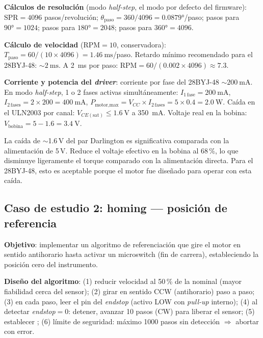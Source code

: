 \documentclass[11pt]{article}
\begin{document}
\textbf{Cálculos de resolución} (modo \emph{half-step}, el modo por defecto del
firmware): $\text{SPR}=4096$ pasos/revolución;
$\theta_\text{paso}=360/4096=0.0879\si{\degree}$/paso; pasos para $90\si{\degree}=1024$;
pasos para $180\si{\degree}=2048$; pasos para $360\si{\degree}=4096$.

\textbf{Cálculo de velocidad} (RPM$=10$, conservadora):
$T_\text{paso}=60/(10\times 4096)=\SI{1.46}{\milli\second}$/paso. Retardo mínimo
recomendado para el 28BYJ-48: $\sim\SI{2}{\milli\second}$. A \SI{2}{\milli\second} por
paso: RPM$=60/(0.002\times 4096)\approx 7.3$.

\textbf{Corriente y potencia del \emph{driver}}: corriente por fase del 28BYJ-48
$\sim\SI{200}{\milli\ampere}$. En modo \emph{half-step}, 1 o 2 fases activas
simultáneamente: $I_{1\,\text{fase}}=\SI{200}{\milli\ampere}$,
$I_{2\,\text{fases}}=2\times 200=\SI{400}{\milli\ampere}$,
$P_\text{motor,max}=V_{CC}\times I_{2\,\text{fases}}=5\times 0.4=\SI{2.0}{\watt}$. Caída
en el ULN2003 por canal: $V_{CE(\text{sat})}\le\SI{1.6}{\volt}$ a \SI{350}{\milli\ampere}.
Voltaje real en la bobina: $V_\text{bobina}=5-1.6=\SI{3.4}{\volt}$.

\begin{nota}
La caída de $\sim$1.6\,V del par Darlington es significativa comparada con la
alimentación de 5\,V. Reduce el voltaje efectivo en la bobina al 68\,\%, lo que
disminuye ligeramente el torque comparado con la alimentación directa. Para el
28BYJ-48, esto es aceptable porque el motor fue diseñado para operar con esta caída.
\end{nota}

\subsection{Caso de estudio 2: homing — posición de referencia}
\textbf{Objetivo}: implementar un algoritmo de referenciación que gire el motor en
sentido antihorario hasta activar un microswitch (fin de carrera), estableciendo la
posición cero del instrumento.

\textbf{Diseño del algoritmo}: (1) reducir velocidad al 50\,\% de la nominal (mayor
fiabilidad cerca del sensor); (2) girar en sentido CCW (antihorario) paso a paso; (3) en
cada paso, leer el pin del \emph{endstop} (activo LOW con \emph{pull-up} interno); (4) al
detectar \emph{endstop}$=0$: detener, avanzar 10 pasos (CW) para liberar el sensor; (5)
establecer ; (6) límite de seguridad: máximo 1000 pasos sin
detección $\Rightarrow$ abortar con error.
\end{document}
